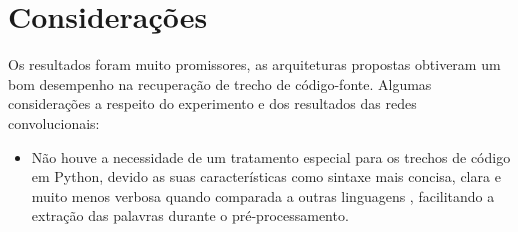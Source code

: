 \section{Considerações}

Os resultados foram muito promissores, as arquiteturas propostas obtiveram um bom desempenho na recuperação de trecho de código-fonte. Algumas considerações a respeito do experimento e dos resultados das redes convolucionais:

\begin{itemize}
    \item Não houve a necessidade de um tratamento especial para os trechos de código em Python, devido as suas características como sintaxe mais concisa, clara e muito menos verbosa quando comparada a outras linguagens \citep{theodora-introductory-programming-python-2015}, facilitando a extração das palavras durante o pré-processamento. 
    

\end{itemize}
